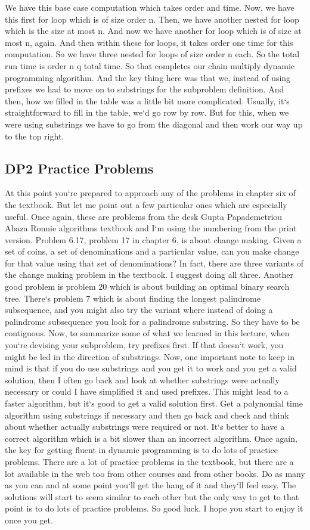 We have this base case computation which takes order and time.
Now, we have this first for loop which is of size order n.
Then, we have another nested for loop which is the size at most n.
And now we have another for loop which is of size at most n, again.
And then within these for loops, it takes order one time for this computation.
So we have three nested for loops of size order n each.
So the total run time is order n q total time.
So that completes our chain multiply dynamic programming algorithm.
And the key thing here was that we, instead of using prefixes we had to move on to substrings for the subproblem definition.
And then, how we filled in the table was a little bit more complicated.
Usually, it`s straightforward to fill in the table, we`d go row by row.
But for this, when we were using substrings we have to go from the diagonal and then work our way up to the top right.

\subsection{DP2  Practice Problems}
At this point you`re prepared to approach any of the problems in chapter six of the textbook.
But let me point out a few particular ones which are especially useful.
Once again, these are problems from the desk Gupta Papademetriou Abaza Ronnie algorithms textbook and I`m using the numbering from the print version.
Problem 6.17, problem 17 in chapter 6, is about change making.
Given a set of coins, a set of denominations and a particular value, can you make change for that value using that set of denominations? In fact, there are three variants of the change making problem in the textbook.
I suggest doing all three.
Another good problem is problem 20 which is about building an optimal binary search tree.
There`s problem 7 which is about finding the longest palindrome subsequence, and you might also try the variant where instead of doing a palindrome subsequence you look for a palindrome substring.
So they have to be contiguous.
Now, to summarize some of what we learned in this lecture, when you`re devising your subproblem, try prefixes first.
If that doesn`t work, you might be led in the direction of substrings.
Now, one important note to keep in mind is that if you do use substrings and you get it to work and you get a valid solution, then I often go back and look at whether substrings were actually necessary or could I have simplified it and used prefixes.
This might lead to a faster algorithm, but it`s good to get a valid solution first.
Get a polynomial time algorithm using substrings if necessary and then go back and check and think about whether actually substrings were required or not.
It`s better to have a correct algorithm which is a bit slower than an incorrect algorithm.
Once again, the key for getting fluent in dynamic programming is to do lots of practice problems.
There are a lot of practice problems in the textbook, but there are a lot available in the web too from other courses and from other books.
Do as many as you can and at some point you`ll get the hang of it and they`ll feel easy.
The solutions will start to seem similar to each other but the only way to get to that point is to do lots of practice problems.
So good luck.
I hope you start to enjoy it once you get.

